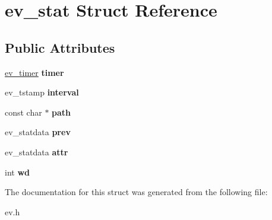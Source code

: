 \hypertarget{structev__stat}{}\section{ev\+\_\+stat Struct Reference}
\label{structev__stat}
\subsection*{Public Attributes}
\begin{DoxyCompactItemize}
\item 
\hypertarget{structev__stat_acec38fb069a9dd9c8f57ea1ca0c70076}{}\label{structev__stat_acec38fb069a9dd9c8f57ea1ca0c70076} 
\hyperlink{structev__timer}{ev\+\_\+timer} {\bfseries timer}
\item 
\hypertarget{structev__stat_a41db8a24ee882bd042baef97ca153def}{}\label{structev__stat_a41db8a24ee882bd042baef97ca153def} 
ev\+\_\+tstamp {\bfseries interval}
\item 
\hypertarget{structev__stat_a90d741ec1bba36e053b47d187b8d377e}{}\label{structev__stat_a90d741ec1bba36e053b47d187b8d377e} 
const char $\ast$ {\bfseries path}
\item 
\hypertarget{structev__stat_a1c5c01c31a95d2062385993ce0a931bf}{}\label{structev__stat_a1c5c01c31a95d2062385993ce0a931bf} 
ev\+\_\+statdata {\bfseries prev}
\item 
\hypertarget{structev__stat_a7988df9156ed36966c979ed78e576350}{}\label{structev__stat_a7988df9156ed36966c979ed78e576350} 
ev\+\_\+statdata {\bfseries attr}
\item 
\hypertarget{structev__stat_ad0c919954f8bc21de322381f0821a06f}{}\label{structev__stat_ad0c919954f8bc21de322381f0821a06f} 
int {\bfseries wd}
\end{DoxyCompactItemize}


The documentation for this struct was generated from the following file\+:\begin{DoxyCompactItemize}
\item 
ev.\+h\end{DoxyCompactItemize}
